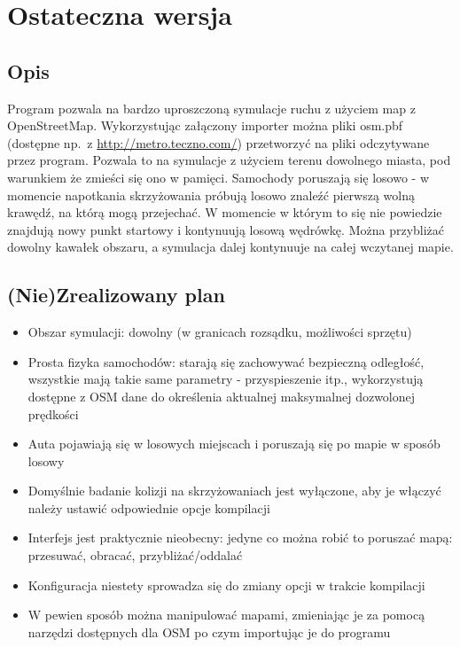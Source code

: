 \documentclass[12pt,leqno]{article}
\begin{document}
\section{Ostateczna wersja}
\subsection{Opis}
Program pozwala na bardzo uproszczoną symulacje ruchu z użyciem map
z OpenStreetMap. Wykorzystując załączony importer można pliki osm.pbf (dostępne
np.\ z \url{http://metro.teczno.com/}) przetworzyć na pliki odczytywane przez
program. Pozwala to na symulacje z użyciem terenu dowolnego miasta, pod
warunkiem że zmieści się ono w pamięci. Samochody poruszają się losowo -
w momencie napotkania skrzyżowania próbują losowo znaleźć pierwszą wolną
krawędź, na którą mogą przejechać. W momencie w którym to się nie powiedzie
znajdują nowy punkt startowy i kontynuują losową wędrówkę. Można przybliżać
dowolny kawałek obszaru, a symulacja dalej kontynuuje na całej wczytanej mapie.

\subsection{(Nie)Zrealizowany plan}
\begin{itemize}
    \item Obszar symulacji: dowolny (w granicach rozsądku, możliwości sprzętu)
    \item Prosta fizyka samochodów: starają się zachowywać bezpieczną odległość,
        wszystkie mają takie same parametry - przyspieszenie itp.,
        wykorzystują dostępne z OSM dane do określenia aktualnej maksymalnej
        dozwolonej prędkości
    \item Auta pojawiają się w losowych miejscach i poruszają się po mapie
        w sposób losowy
    \item Domyślnie badanie kolizji na skrzyżowaniach jest wyłączone, aby je
        włączyć należy ustawić odpowiednie opcje kompilacji
    \item Interfejs jest praktycznie nieobecny: jedyne co można robić to
        poruszać mapą: przesuwać, obracać, przybliżać/oddalać
    \item Konfiguracja niestety sprowadza się do zmiany opcji w trakcie
        kompilacji
    \item W pewien sposób można manipulować mapami, zmieniając je za pomocą
        narzędzi dostępnych dla OSM po czym importując je do programu
\end{itemize}
\end{document}
